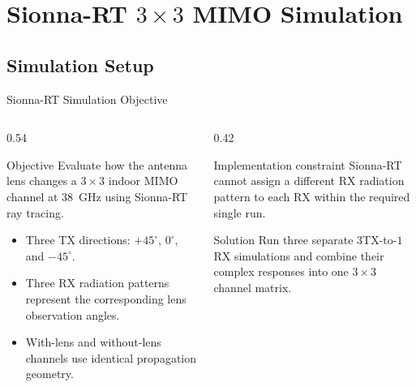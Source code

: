 
\section{Sionna-RT \texorpdfstring{$3\times3$}{3x3} MIMO Simulation}

\subsection{Simulation Setup}

\begin{frame}[t,shrink=8]{Sionna-RT Simulation Objective}
    \begin{columns}[T,onlytextwidth]
        \begin{column}{0.54\textwidth}
            \begin{block}{Objective}
                Evaluate how the antenna lens changes a $3\times3$ indoor
                MIMO channel at 38~GHz using Sionna-RT ray tracing.
            \end{block}

            \begin{itemize}
                \item Three TX directions: $+45^\circ$, $0^\circ$, and
                $-45^\circ$.
                \item Three RX radiation patterns represent the corresponding
                lens observation angles.
                \item With-lens and without-lens channels use identical
                propagation geometry.
            \end{itemize}
        \end{column}
        \begin{column}{0.42\textwidth}
            \begin{alertblock}{Implementation constraint}
                Sionna-RT cannot assign a different RX radiation pattern to
                each RX within the required single run.
            \end{alertblock}
            \begin{exampleblock}{Solution}
                Run three separate $3$TX-to-$1$RX simulations and combine
                their complex responses into one $3\times3$ channel matrix.
            \end{exampleblock}
        \end{column}
    \end{columns}
\end{frame}

